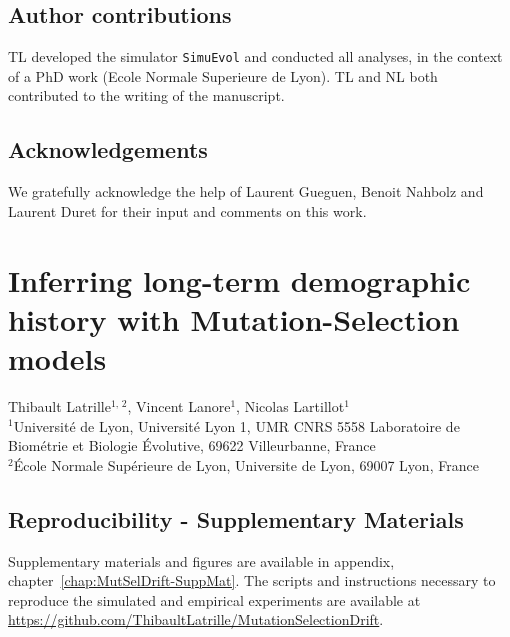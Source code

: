 \documentclass[a4paper,oneside,nobind]{thesis}
\begin{document}
{\hypersetup{linkcolor=GREYDARK}\minitoc}


\section{Author contributions}
TL developed the simulator \texttt{SimuEvol} and conducted all analyses, in the context of a PhD work (Ecole Normale Superieure de Lyon).
TL and NL both contributed to the writing of the manuscript.

\section{Acknowledgements}
We gratefully acknowledge the help of Laurent Gueguen, Benoit Nahbolz and Laurent Duret for their input and comments on this work.

\thispagestyle{empty}
\chapter[Inferring long-term population size] {Inferring long-term demographic history with Mutation-Selection models}
\label{chap:MutSelDrift}

\begin{center}
	\Large Thibault Latrille$^{\text{1, 2}}$, Vincent Lanore$^{\text{1}}$, Nicolas Lartillot$^{\text{1}}$\\
	\vspace{0.5cm}
	\normalsize
	$^{\text{1}}$Université de Lyon, Université Lyon 1, UMR CNRS 5558 Laboratoire de Biométrie et Biologie Évolutive, 69622 Villeurbanne, France\\
	$^{\text{2}}$École Normale Supérieure de Lyon, Universite de Lyon, 69007 Lyon, France\\
\end{center}

{\hypersetup{linkcolor=GREYDARK}\minitoc}



\section{Reproducibility - Supplementary Materials}
Supplementary materials and figures are available in appendix, chapter~\ref{chap:MutSelDrift-SuppMat}.
The scripts and instructions necessary to reproduce the simulated and empirical experiments are available at \url{https://github.com/ThibaultLatrille/MutationSelectionDrift}.
\end{document}
